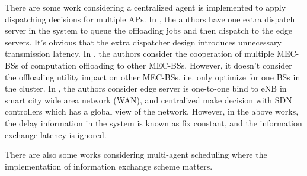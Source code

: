 
There are some work considering a centralized agent is implemented to apply dispatching decisions for multiple APs.
In \cite{IOTJ19-CaoJ}, the authors have one extra dispatch server in the system to queue the offloading jobs and then dispatch to the edge servers.
It's obvious that the extra dispatcher design introduces unnecessary transmission latency.
In \cite{Fan2017}, the authors consider the cooperation of multiple MEC-BSs of computation offloading to other MEC-BSs. However, it doesn't consider the offloading utility impact on other MEC-BSs, i.e. only optimize for one BSs in the cluster.
In \cite{JSAC19-AlameddineHA}, the authors consider edge server is one-to-one bind to eNB  in smart city wide area network (WAN), and centralized make decision with SDN controllers which has a global view of the network.
However, in the above works, the delay information in the system is known as fix constant, and the information exchange latency is ignored.

There are also some works considering multi-agent scheduling where the implementation of information exchange scheme matters.

